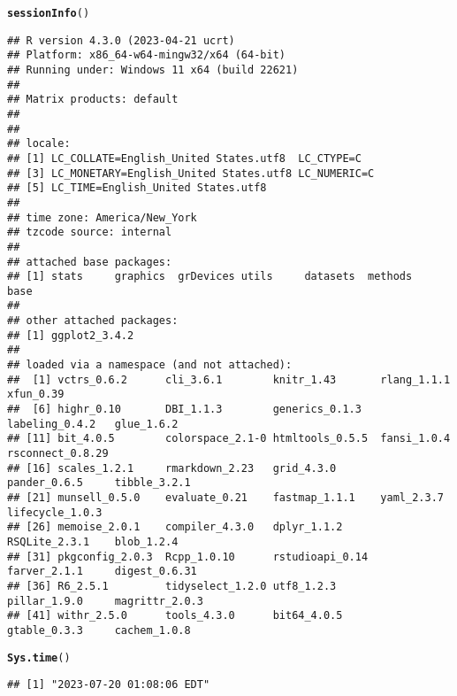 \documentclass{article}\usepackage[]{graphicx}\usepackage[]{xcolor}
\makeatletter
\newcommand{\hlstd}[1]{\textcolor[rgb]{0.345,0.345,0.345}{#1}}%
\newcommand{\hlkwd}[1]{\textcolor[rgb]{0.737,0.353,0.396}{\textbf{#1}}}%
\newenvironment{kframe}{%
 \def\at@end@of@kframe{}%
 \ifinner\ifhmode%
  \def\at@end@of@kframe{\end{minipage}}%
  \begin{minipage}{\columnwidth}%
 \fi\fi%
 \def\FrameCommand##1{\hskip\@totalleftmargin \hskip-\fboxsep
 \colorbox{shadecolor}{##1}\hskip-\fboxsep
     \hskip-\linewidth \hskip-\@totalleftmargin \hskip\columnwidth}%
 \MakeFramed {\advance\hsize-\width
   \@totalleftmargin\z@ \linewidth\hsize
   \@setminipage}}%
 {\par\unskip\endMakeFramed%
 \at@end@of@kframe}
\newenvironment{knitrout}{}{} %
\makeatother
\begin{document}
\begin{knitrout}
\color{fgcolor}\begin{kframe}
\begin{alltt}
\hlkwd{sessionInfo}\hlstd{()}
\end{alltt}
\begin{verbatim}
## R version 4.3.0 (2023-04-21 ucrt)
## Platform: x86_64-w64-mingw32/x64 (64-bit)
## Running under: Windows 11 x64 (build 22621)
## 
## Matrix products: default
## 
## 
## locale:
## [1] LC_COLLATE=English_United States.utf8  LC_CTYPE=C                            
## [3] LC_MONETARY=English_United States.utf8 LC_NUMERIC=C                          
## [5] LC_TIME=English_United States.utf8    
## 
## time zone: America/New_York
## tzcode source: internal
## 
## attached base packages:
## [1] stats     graphics  grDevices utils     datasets  methods   base     
## 
## other attached packages:
## [1] ggplot2_3.4.2
## 
## loaded via a namespace (and not attached):
##  [1] vctrs_0.6.2      cli_3.6.1        knitr_1.43       rlang_1.1.1      xfun_0.39       
##  [6] highr_0.10       DBI_1.1.3        generics_0.1.3   labeling_0.4.2   glue_1.6.2      
## [11] bit_4.0.5        colorspace_2.1-0 htmltools_0.5.5  fansi_1.0.4      rsconnect_0.8.29
## [16] scales_1.2.1     rmarkdown_2.23   grid_4.3.0       pander_0.6.5     tibble_3.2.1    
## [21] munsell_0.5.0    evaluate_0.21    fastmap_1.1.1    yaml_2.3.7       lifecycle_1.0.3 
## [26] memoise_2.0.1    compiler_4.3.0   dplyr_1.1.2      RSQLite_2.3.1    blob_1.2.4      
## [31] pkgconfig_2.0.3  Rcpp_1.0.10      rstudioapi_0.14  farver_2.1.1     digest_0.6.31   
## [36] R6_2.5.1         tidyselect_1.2.0 utf8_1.2.3       pillar_1.9.0     magrittr_2.0.3  
## [41] withr_2.5.0      tools_4.3.0      bit64_4.0.5      gtable_0.3.3     cachem_1.0.8
\end{verbatim}
\begin{alltt}
\hlkwd{Sys.time}\hlstd{()}
\end{alltt}
\begin{verbatim}
## [1] "2023-07-20 01:08:06 EDT"
\end{verbatim}
\end{kframe}
\end{knitrout}
\end{document}
